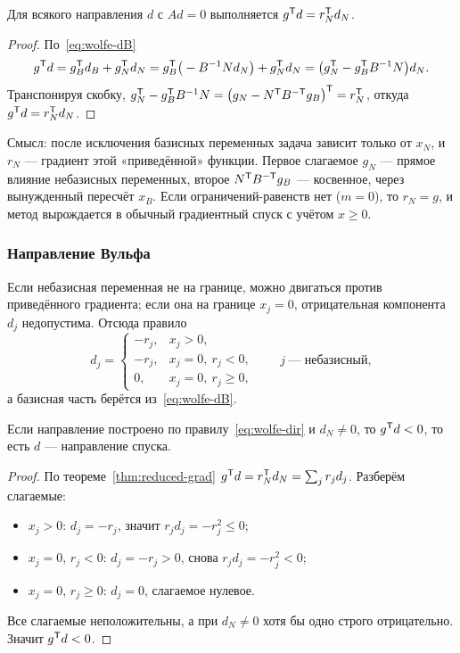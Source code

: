 \begin{theorem}\label{thm:reduced-grad}
Для всякого направления $d$ с $Ad = 0$ выполняется
$g^{\mathsf{T}} d = r_N^{\mathsf{T}} d_N$.
\end{theorem}

\begin{proof}
По~\eqref{eq:wolfe-dB}
\[
  g^{\mathsf{T}} d = g_B^{\mathsf{T}} d_B + g_N^{\mathsf{T}} d_N
        = g_B^{\mathsf{T}}\big(-B^{-1}N d_N\big) + g_N^{\mathsf{T}} d_N
        = \big(g_N^{\mathsf{T}} - g_B^{\mathsf{T}} B^{-1}N\big) d_N .
\]
Транспонируя скобку, $g_N^{\mathsf{T}} - g_B^{\mathsf{T}} B^{-1}N
= \big(g_N - N^{\mathsf{T}} B^{-\mathsf{T}} g_B\big)^{\mathsf{T}} = r_N^{\mathsf{T}}$, откуда
$g^{\mathsf{T}} d = r_N^{\mathsf{T}} d_N$.
\end{proof}

\begin{idea}
Смысл: после исключения базисных переменных задача зависит только от $x_N$, и
$r_N$ — градиент этой «приведённой» функции. Первое слагаемое $g_N$ — прямое
влияние небазисных переменных, второе $N^{\mathsf{T}} B^{-\mathsf T}g_B$ — косвенное,
через вынужденный пересчёт $x_B$. Если ограничений-равенств нет ($m = 0$), то
$r_N = g$, и метод вырождается в обычный градиентный спуск с учётом $x \ge 0$.
\end{idea}

\subsubsection*{Направление Вульфа}

Если небазисная переменная не на границе, можно двигаться против приведённого
градиента; если она на границе $x_j = 0$, отрицательная компонента $d_j$
недопустима. Отсюда правило
\begin{equation}\label{eq:wolfe-dir}
  d_j =
  \begin{cases}
    -r_j , & x_j > 0 , \\
    -r_j , & x_j = 0,\ r_j < 0 , \\
    0 , & x_j = 0,\ r_j \ge 0 ,
  \end{cases}
  \qquad j \ \text{— небазисный},
\end{equation}
а базисная часть берётся из~\eqref{eq:wolfe-dB}.

\begin{theorem}\label{thm:wolfe-descent}
Если направление построено по правилу~\eqref{eq:wolfe-dir} и $d_N \ne 0$, то
$g^{\mathsf{T}} d < 0$, то есть $d$ — направление спуска.
\end{theorem}

\begin{proof}
По теореме~\ref{thm:reduced-grad} $g^{\mathsf{T}} d = r_N^{\mathsf{T}} d_N = \sum_j r_j d_j$.
Разберём слагаемые:
\begin{itemize}[nosep,left=0pt]
  \item $x_j > 0$: $d_j = -r_j$, значит $r_j d_j = -r_j^2 \le 0$;
  \item $x_j = 0$, $r_j < 0$: $d_j = -r_j > 0$, снова $r_j d_j = -r_j^2 < 0$;
  \item $x_j = 0$, $r_j \ge 0$: $d_j = 0$, слагаемое нулевое.
\end{itemize}
Все слагаемые неположительны, а при $d_N \ne 0$ хотя бы одно строго
отрицательно. Значит $g^{\mathsf{T}} d < 0$.
\end{proof}

